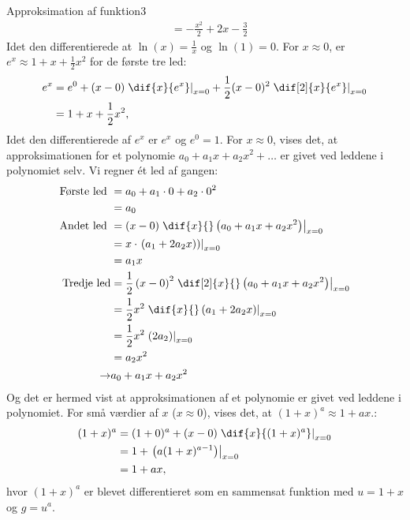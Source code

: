 \begin{opgave}{Approksimation af funktion}{3}
\begin{align*}
  &= - \frac{x^2}{2} + 2x - \frac{3}{2}
  \end{align*}
  Idet den differentierede at $\ln (x) = \frac{1}{x}$ og $\ln (1)=0$.
  \opg For $x \approx 0$, er $e^x \approx 1 + x + \frac{1}{2}
  x^2$ for de første tre led:
  \begin{align*}
  e^x &= e^0 + (x-0) \left. \dif{x}{e^x}\right|_{x=0} + \frac{1}{2}(x-0)^2 \left. \dif[2]{x}{e^x}\right|_{x=0} \\
  &=1 + x + \frac{1}{2} x^2,
  \end{align*}
  Idet den differentierede af $e^x$ er $e^x$ og $e^0 = 1$.
  \opg For $x \approx 0$, vises det, at approksimationen for et polynomie
  $a_0 + a_1 x + a_2 x^2 + \ldots$ er givet ved leddene i polynomiet
  selv. Vi regner ét led af gangen:
  \begin{align*}
  \text{Første led } &= a_0 + a_1\cdot 0 + a_2 \cdot 0^2 \\
  &= a_0 \\
  \text{Andet led } &= (x-0) \left. \dif{x}{} \left(a_0 + a_1x + a_2x^2 \right)\right|_{x=0} \\
  &= x \cdot \left. \left(a_1 + 2a_2x) \right)\right|_{x=0} \\
  &= a_1 x \\
  \text{Tredje led} &= \frac{1}{2} \left( x-0 \right)^2 \left. \dif[2]{x}{} \left(a_0 + a_1x + a_2x^2 \right)\right|_{x=0} \\
  &= \frac{1}{2} x^2 \left. \dif{x}{} \left(a_1 + 2a_2x \right)\right|_{x=0} \\
  &= \frac{1}{2} x^2 \left. \left( 2a_2 \right)\right|_{x=0} \\
  &= a_2 x^2 \\
  \rightarrow & a_0 + a_1x+a_2x^2
  \end{align*}
  Og det er hermed vist at approksimationen af et polynomie er givet ved leddene i polynomiet.
  \opg For små værdier af $x$ ($x \approx 0$), vises det, at $(1 + x)^a \approx 1 + ax$.:
  \begin{align*}
  (1+x)^a &= (1+0)^a + (x-0) \left. \dif{x}{(1+x)^a}\right|_{x=0} \\
  &= 1 + \left. \left( a(1+x)^{a-1} \right)\right|_{x=0} \\
  &= 1 + ax,
  \end{align*}
  hvor $(1+x)^a$ er blevet differentieret som en sammensat funktion med $u=1+x$ og $g=u^a$.
\end{opgave}

